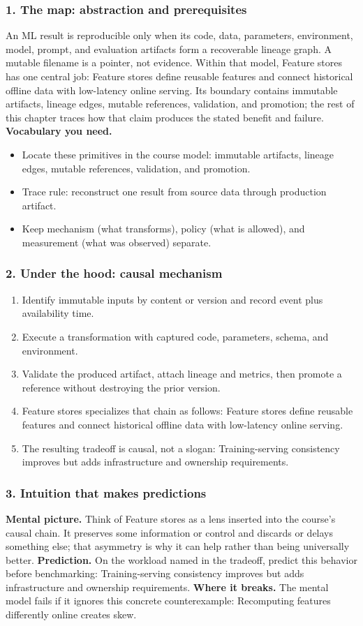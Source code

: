 \subsubsection*{1. The map: abstraction and prerequisites}
An ML result is reproducible only when its code, data, parameters, environment, model, prompt, and evaluation artifacts form a recoverable lineage graph. A mutable filename is a pointer, not evidence.
Within that model, Feature stores has one central job: Feature stores define reusable features and connect historical offline data with low-latency online serving. Its boundary contains immutable artifacts, lineage edges, mutable references, validation, and promotion; the rest of this chapter traces how that claim produces the stated benefit and failure.
\textbf{Vocabulary you need.}\begin{itemize}
\item Locate these primitives in the course model: immutable artifacts, lineage edges, mutable references, validation, and promotion.
\item Trace rule: reconstruct one result from source data through production artifact.
\item Keep mechanism (what transforms), policy (what is allowed), and measurement (what was observed) separate.
\end{itemize}
\subsubsection*{2. Under the hood: causal mechanism}\begin{enumerate}
\item Identify immutable inputs by content or version and record event plus availability time.
\item Execute a transformation with captured code, parameters, schema, and environment.
\item Validate the produced artifact, attach lineage and metrics, then promote a reference without destroying the prior version.
\item Feature stores specializes that chain as follows: Feature stores define reusable features and connect historical offline data with low-latency online serving.
\item The resulting tradeoff is causal, not a slogan: Training-serving consistency improves but adds infrastructure and ownership requirements.
\end{enumerate}
\subsubsection*{3. Intuition that makes predictions}
\textbf{Mental picture.} Think of Feature stores as a lens inserted into the course's causal chain. It preserves some information or control and discards or delays something else; that asymmetry is why it can help rather than being universally better.
\textbf{Prediction.} On the workload named in the tradeoff, predict this behavior before benchmarking: Training-serving consistency improves but adds infrastructure and ownership requirements.
\textbf{Where it breaks.} The mental model fails if it ignores this concrete counterexample: Recomputing features differently online creates skew.
